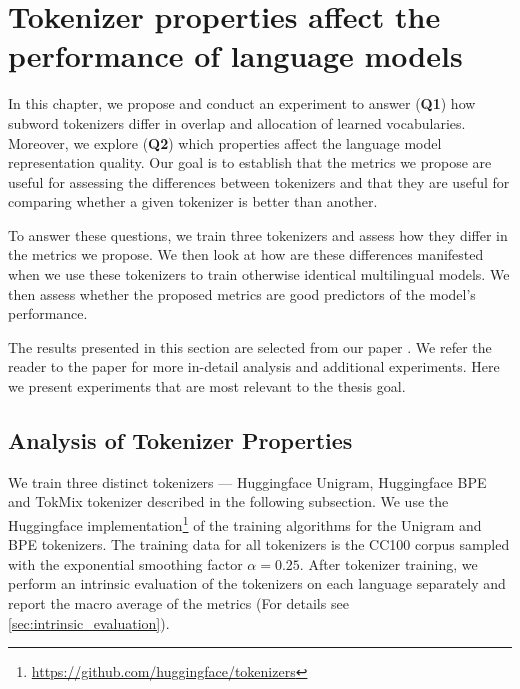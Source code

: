 \chapter{Tokenizer properties affect the performance of language models}
\label{chap:experiment_1_validity}


In this chapter, we propose and conduct an experiment to answer (\textbf{Q1}) how subword tokenizers differ in overlap and allocation of learned vocabularies. Moreover, we explore (\textbf{Q2}) which properties affect the language model representation quality. Our goal is to establish that the metrics we propose are useful for assessing the differences between tokenizers and that they are useful for comparing whether a given tokenizer is better than another.

To answer these questions, we train three tokenizers and assess how they differ in the metrics we propose. We then look at how are these differences manifested when we use these tokenizers to train otherwise identical multilingual models. We then assess whether the proposed metrics are good predictors of the model's performance.

The results presented in this section are selected from our paper \citet{limisiewicz_tokenization_2023}. We refer the reader to the paper for more in-detail analysis and additional experiments. Here we present experiments that are most relevant to the thesis goal.

\section{Analysis of Tokenizer Properties}

We train three distinct tokenizers --- Huggingface Unigram, Huggingface BPE and TokMix tokenizer \cite{limisiewicz_tokenization_2023} described in the following subsection. We use the Huggingface implementation\footnote{\href{https://github.com/huggingface/tokenizers}{https://github.com/huggingface/tokenizers}} of the training algorithms for the Unigram and BPE tokenizers. The training data for all tokenizers is the CC100 corpus sampled with the exponential smoothing factor $\alpha=0.25$.
After tokenizer training, we perform an intrinsic evaluation of the tokenizers on each language separately and report the macro average of the metrics (For details see \autoref{sec:intrinsic_evaluation}).

